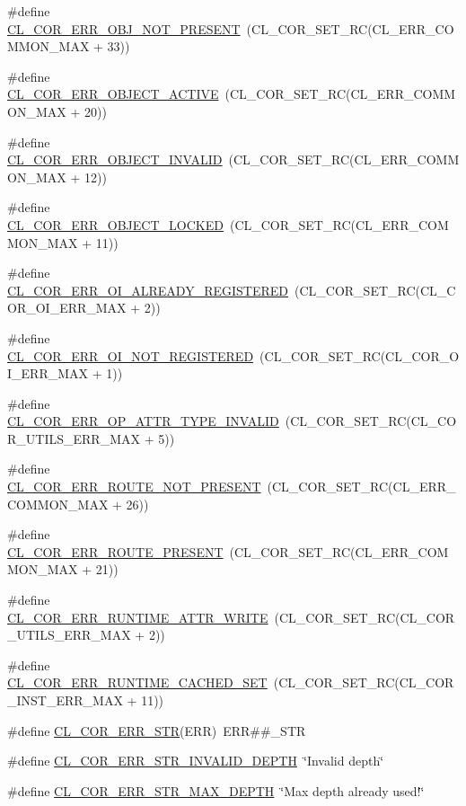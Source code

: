 \begin{CompactItemize}
\item 
\#define \hyperlink{group__group13_ga188}{CL\_\-COR\_\-ERR\_\-OBJ\_\-NOT\_\-PRESENT}~(CL\_\-COR\_\-SET\_\-RC(CL\_\-ERR\_\-COMMON\_\-MAX + 33))
\item 
\#define \hyperlink{group__group13_ga175}{CL\_\-COR\_\-ERR\_\-OBJECT\_\-ACTIVE}~(CL\_\-COR\_\-SET\_\-RC(CL\_\-ERR\_\-COMMON\_\-MAX + 20))
\item 
\#define \hyperlink{group__group13_ga167}{CL\_\-COR\_\-ERR\_\-OBJECT\_\-INVALID}~(CL\_\-COR\_\-SET\_\-RC(CL\_\-ERR\_\-COMMON\_\-MAX + 12))
\item 
\#define \hyperlink{group__group13_ga166}{CL\_\-COR\_\-ERR\_\-OBJECT\_\-LOCKED}~(CL\_\-COR\_\-SET\_\-RC(CL\_\-ERR\_\-COMMON\_\-MAX + 11))
\item 
\#define \hyperlink{group__group13_ga258}{CL\_\-COR\_\-ERR\_\-OI\_\-ALREADY\_\-REGISTERED}~(CL\_\-COR\_\-SET\_\-RC(CL\_\-COR\_\-OI\_\-ERR\_\-MAX + 2))
\item 
\#define \hyperlink{group__group13_ga257}{CL\_\-COR\_\-ERR\_\-OI\_\-NOT\_\-REGISTERED}~(CL\_\-COR\_\-SET\_\-RC(CL\_\-COR\_\-OI\_\-ERR\_\-MAX + 1))
\item 
\#define \hyperlink{group__group13_ga245}{CL\_\-COR\_\-ERR\_\-OP\_\-ATTR\_\-TYPE\_\-INVALID}~(CL\_\-COR\_\-SET\_\-RC(CL\_\-COR\_\-UTILS\_\-ERR\_\-MAX + 5))
\item 
\#define \hyperlink{group__group13_ga181}{CL\_\-COR\_\-ERR\_\-ROUTE\_\-NOT\_\-PRESENT}~(CL\_\-COR\_\-SET\_\-RC(CL\_\-ERR\_\-COMMON\_\-MAX + 26))
\item 
\#define \hyperlink{group__group13_ga176}{CL\_\-COR\_\-ERR\_\-ROUTE\_\-PRESENT}~(CL\_\-COR\_\-SET\_\-RC(CL\_\-ERR\_\-COMMON\_\-MAX + 21))
\item 
\#define \hyperlink{group__group13_ga242}{CL\_\-COR\_\-ERR\_\-RUNTIME\_\-ATTR\_\-WRITE}~(CL\_\-COR\_\-SET\_\-RC(CL\_\-COR\_\-UTILS\_\-ERR\_\-MAX + 2))
\item 
\#define \hyperlink{group__group13_ga224}{CL\_\-COR\_\-ERR\_\-RUNTIME\_\-CACHED\_\-SET}~(CL\_\-COR\_\-SET\_\-RC(CL\_\-COR\_\-INST\_\-ERR\_\-MAX + 11))
\item 
\#define \hyperlink{group__group13_ga273}{CL\_\-COR\_\-ERR\_\-STR}(ERR)~ERR\#\#\_\-STR
\item 
\#define \hyperlink{group__group13_ga262}{CL\_\-COR\_\-ERR\_\-STR\_\-INVALID\_\-DEPTH}~\char`\"{}Invalid depth\char`\"{}
\item 
\#define \hyperlink{group__group13_ga261}{CL\_\-COR\_\-ERR\_\-STR\_\-MAX\_\-DEPTH}~\char`\"{}Max depth already used!\char`\"{}
\item 

\end{CompactItemize}
